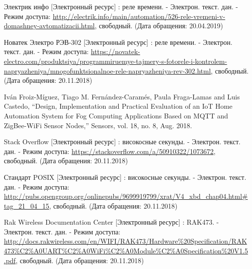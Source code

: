 \begin{my_enumerate}
\item Электрик инфо [Электронный ресурс] : реле времени. - Электрон. текст. дан. - Режим доступа: \url{http://electrik.info/main/automation/526-rele-vremeni-v-domashney-avtomatizacii.html}, свободный. (Дата обращения: 20.04.2019)

\item Новатек Электро РЭВ-302 [Электронный ресурс] : реле времени. - Электрон. текст. дан. - Режим доступа: \url{https://novatek-electro.com/produktsiya/programmiruemye-tajmery-s-fotorele-i-kontrolem-napryazheniya/mnogofunktsionalnoe-rele-napryazheniya-rev-302.html}, свободный. (Дата обращения: 20.11.2018)

\item Iván Froiz-Míguez, Tiago M. Fernández-Caramés, Paula Fraga-Lamas and Luis Castedo, “Design, Implementation and Practical Evaluation of an IoT Home Automation System for Fog Computing Applications Based on MQTT and ZigBee-WiFi Sensor Nodes,” Sensors, vol. 18, no. 8, Aug. 2018.






\item Stack Overflow [Электронный ресурс] : високосные секунды. - Электрон. текст. дан. - Режим доступа: \url{https://stackoverflow.com/a/50910322/1073672}, свободный. (Дата обращения: 20.11.2018)

\item Стандарт POSIX [Электронный ресурс] : високосные секунды. - Электрон. текст. дан. - Режим доступа: \url{http://pubs.opengroup.org/onlinepubs/9699919799/xrat/V4_xbd_chap04.html#tag_21_04_15}, свободный. (Дата обращения: 20.11.2018)

\item Rak Wireless Documentation Center [Электронный ресурс] : RAK473. - Электрон. текст. дан. - Режим доступа: \url{http://docs.rakwireless.com/en/WIFI/RAK473/Hardware%20Specification/RAK473%C2%A0UART%C2%A0WiFi%C2%A0Module%C2%A0Specification%20V1.5.pdf}, свободный. (Дата обращения: 20.11.2018)


\end{my_enumerate}
